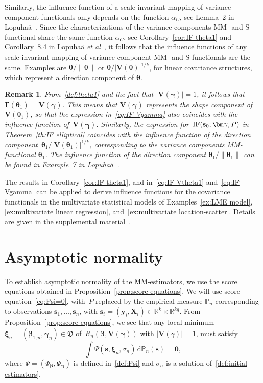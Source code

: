 \documentclass{article}
\numberwithin{equation}{section}
\theoremstyle{plain}
\newtheorem{remark}{Remark}[section]
\newcommand{\R}{\mathbb{R}}
\newcommand{\dd}{\mathrm{d}}
\newcommand{\bbeta}{\bm\beta}
\newcommand{\btheta}{\bm\theta}
\newcommand{\bxi}{\bm\xi}
\newcommand{\bgamma}{\bm\gamma}
\newcommand{\bGamma}{\bm\Gamma}
\newcommand{\by}{\mathbf{y}}
\newcommand{\bs}{\mathbf{s}}
\newcommand{\bX}{\mathbf{X}}
\newcommand{\bV}{\mathbf{V}}
\begin{document}
Similarly, the influence function of a scale invariant mapping of variance component functionals
only depends on the function $\alpha_C$, see Lemma~2 in Lopuha\"a~\cite{lopuhaa2025}.
Since the characterizations of the variance components MM- and S-functional share the same function $\alpha_C$,
see Corollary~\ref{cor:IF theta1} and Corollary~8.4 in Lopuha\"a \emph{et al}~\cite{lopuhaa-gares-ruizgazen2023},
it follows that the influence functions of any scale invariant mapping of variance component MM- and S-functionals are the same.
Examples are $\btheta/\|\btheta\|$ or $\btheta/|\bV(\btheta)|^{1/k}$, for linear covariance structures,
which represent a direction component of $\btheta$.
\begin{remark}
\label{rem:IF Vgamma and gamma}
From~\eqref{def:theta1} and the fact that $|\bV(\bgamma)|=1$, 
it follows that $\bGamma(\btheta_1)=\bV(\bgamma)$.
This means that $\bV(\bgamma)$ represents the shape component of $\bV(\btheta_1)$,
so that the expression in~\eqref{eq:IF Vgamma}
also coincides with the
influence function of~$\bV(\bgamma)$.
Similarly, the expression for~$\text{\rm IF}(\bs_0;\bgamma,P)$ in Theorem~\ref{th:IF elliptical}
coincides with the influence function of the direction component~$\btheta_1/|\bV(\btheta_1)|^{1/k}$, 
corresponding to the variance components MM-functional $\btheta_1$.
The influence function of the direction component $\btheta_1/\|\btheta_1\|$
can be found in Example~7 in Lopuha\"a~\cite{lopuhaa2025}.
\end{remark}
The results in Corollary~\ref{cor:IF theta1},  and in~\eqref{eq:IF Vtheta1} and~\eqref{eq:IF Vgamma} can be applied
to derive influence functions for the covariance functionals in the multivariate statistical models
of Examples~\ref{ex:LME model}, \ref{ex:multivariate linear regression}, and~\ref{ex:multivariate location-scatter}.
Details are given in the supplemental material~\cite{supplement2025}.
\section{Asymptotic normality}
\label{sec:asymp norm}
To establish asymptotic normality of the MM-estimators, we use the score equations
obtained in Proposition~\ref{prop:score equations}.
We will use score equation~\eqref{eq:Psi=0}, 
with~$P$ replaced by the empirical measure $\mathbb{P}_n$
corresponding to observations
$\bs_1,\ldots,\bs_n$, with $\bs_i=(\by_i,\bX_i)\in\R^k\times\R^{kq}$.
From Proposition~\ref{prop:score equations}, we see that any local minimum $\bxi_n=(\bbeta_{1,n},\bgamma_n)\in \mathfrak{D}$ 
of~$R_n(\bbeta,\bV(\bgamma))$ with $|\bV(\gamma)|=1$, must satisfy
\begin{equation}
\label{eq:M-equation estimator}
\int
\Psi(\mathbf{s},\bxi_n,\sigma_n)\,\dd \mathbb{P}_n(\mathbf{s})
=
\mathbf{0},
\end{equation}
where $\Psi=(\Psi_{\bbeta},\Psi_{\bgamma})$ is defined in~\eqref{def:Psi}
and $\sigma_n$ is a solution of~\eqref{def:initial estimators}.
\end{document}
